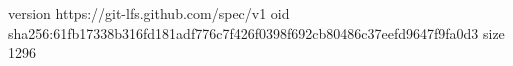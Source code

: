 version https://git-lfs.github.com/spec/v1
oid sha256:61fb17338b316fd181adf776c7f426f0398f692cb80486c37eefd9647f9fa0d3
size 1296
